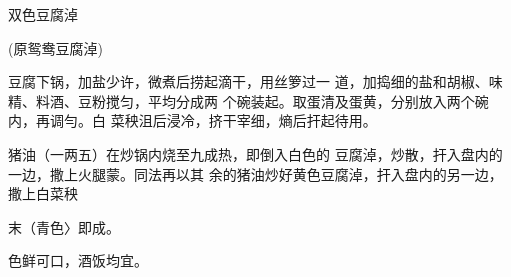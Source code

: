 \begin{recipe}{双色豆腐淖}

(原鸳鸯豆腐淖)

\ingredients


\cooking

\step 	豆腐下锅，加盐少许，微煮后捞起滴干，用丝箩过一 道，加捣细的盐和胡椒、味精、料酒、豆粉搅匀，平均分成两 个碗装起。取蛋清及蛋黄，分别放入两个碗内，再调勻。白 菜秧沮后浸冷，挤干宰细，熵后扞起待用。

\step 	猪油（一两五）在炒锅内烧至九成热，即倒入白色的 豆腐淖，炒散，扞入盘内的一边，撒上火腿蒙。同法再以其 余的猪油炒好黄色豆腐淖，扞入盘内的另一边，撒上白菜秧

末（青色〉即成。

\notes

色鲜可口，酒饭均宜。

\end{recipe}

